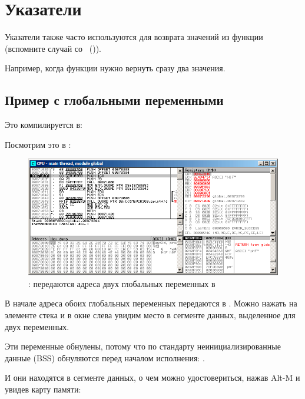 \chapter{Указатели}
\myindex{\CLanguageElements!\Pointers}
\label{label_pointers}

Указатели также часто используются для возврата значений из функции (вспомните случай со \scanf{}~()).

Например, когда функции нужно вернуть сразу два значения.

\section{Пример с глобальными переменными}



Это компилируется в:



\myindex{\olly}
\clearpage
Посмотрим это в \olly:

\begin{figure}[H]
\centering
\includegraphics[scale=\FigScale]{patterns/061_pointers/olly_global1.png}
\caption{\olly: передаются адреса двух глобальных переменных в \ttfone}
\label{fig:pointers_olly_global_1}
\end{figure}

В начале адреса обоих глобальных переменных передаются в \ttfone.
Можно нажать  на элементе стека и в окне слева 
увидим место в сегменте данных, выделенное для двух переменных.

Эти переменные обнулены, потому что по стандарту неинициализированные данные (\ac{BSS}) 
обнуляются перед началом исполнения: \cite[6.7.8p10]{C99TC3}.

\clearpage

И они находятся в сегменте данных, о чем можно удостовериться, нажав Alt-M и увидев карту памяти:

